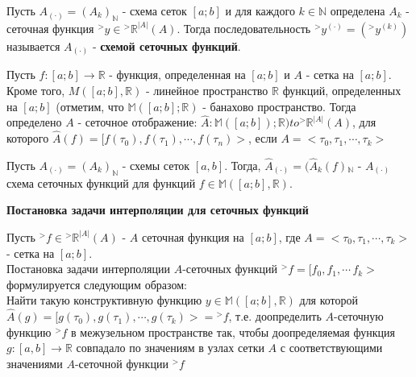 \documentclass[__main__.tex]{subfiles}
\begin{document}
\begin{definition}
Пусть $A_{(\cdot)} = (A_k)_{\mathbb{N}}$ - схема сеток $[a; b]$ и для каждого $k \in \mathbb{N}$ определена $A_k$ - сеточная функция ${}^{>}y \in {}^{>} \mathbb{R}^{|A|}(A)$. Тогда последовательность ${}^{>}y^{(\cdot)} = ({}^{>}y^{(k)})$ называется $A_{(\cdot)}$ - \textbf{схемой сеточных функций}.
\end{definition}

\begin{definition}
Пусть $f : [a; b] \to \mathbb{R}$ - функция, определенная на $[a; b]$ и $A$ - сетка на $[a; b]$. Кроме того, $M([a; b], \mathbb{R})$ - линейное пространство $\mathbb{R}$ функций, определенных на $[a; b]$ (отметим, что $\mathbb{M}([a; b]; \mathbb{R})$ - банахово пространство. Тогда определено $A$ - сеточное отображение: $\hat{A}: \mathbb{M}([a; b]); \mathbb{R}) to {}^{>}\mathbb{R}^{|A|}(A)$, для которого $\hat{A}(f) = [f(\tau_0), f(\tau_1), \cdots, f(\tau_n)>$, если $A = <\tau_0, \tau_1, \cdots, \tau_k>$
\end{definition}

\begin{definition}
Пусть $A_(\cdot) = (A_k)_{\mathbb{N}}$ - схемы сеток $[a, b]$. Тогда, $\hat{A}_{(\cdot)} = (\hat{A}_ k (f) {}_{\mathbb{N}}$ - $A_{(\cdot)}$ схема сеточных функций для функций $f \in \mathbb{M}([a; b], \mathbb{R})$.
\end{definition}

\textbf{Постановка задачи интерполяции для сеточных функций}

Пусть ${}^{>}f \in {}^{>}\mathbb{R}^{|A|}(A)$ - $A$ сеточная функция на $[a; b]$, где $A = <\tau_0, \tau_1, \cdots, \tau_k>$ - сетка на $[a; b]$.\\

Постановка задачи интерполяции $A$-сеточных функций ${}^{>}f = [f_0, f_1, \cdots\, f_k>$ формулируется следующим образом:\\

Найти такую конструктивную функцию $y \in \mathbb{M}([a; b], \mathbb{R})$ для которой $\hat{A}(g) = [g(\tau_0), g(\tau_1), \cdots, g(\tau_k)> = {}^{>}f$, т.е. доопределить $A$-сеточную функцию ${}^{>}f$ в межузельном пространстве так, чтобы доопределяемая функция $g: [a, b] \to \mathbb{R}$ совпадало по значениям в узлах сетки $A$ с соответствующими значениями $A$-сеточной функции ${}^{>}f$
\end{document}
